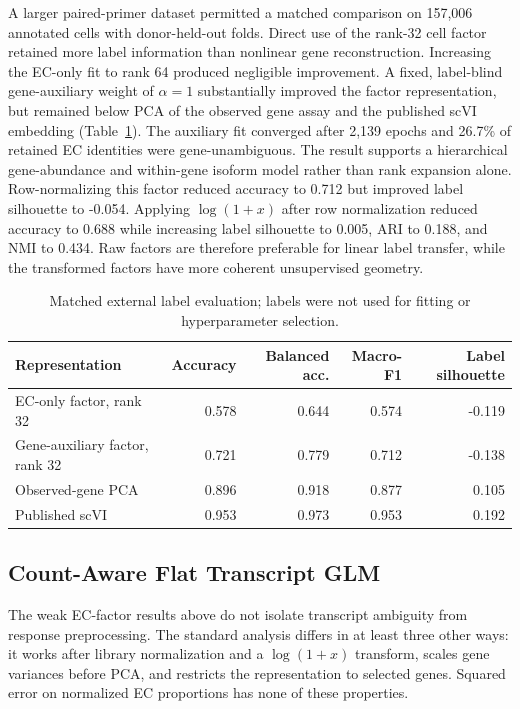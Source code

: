 \documentclass[11pt]{article}
\begin{document}
A larger paired-primer dataset permitted a matched comparison on 157,006
annotated cells with donor-held-out folds. Direct use of the rank-32 cell
factor retained more label information than nonlinear gene reconstruction.
Increasing the EC-only fit to rank 64 produced negligible improvement. A
fixed, label-blind gene-auxiliary weight of \(\alpha=1\) substantially improved
the factor representation, but remained below PCA of the observed gene assay
and the published scVI embedding (Table~\ref{tab:gene-aux-validation}).
The auxiliary fit converged after 2,139 epochs and 26.7\% of retained EC
identities were gene-unambiguous. The result supports a hierarchical
gene-abundance and within-gene isoform model rather than rank expansion alone.
Row-normalizing this factor reduced accuracy to 0.712 but improved label
silhouette to -0.054. Applying \(\log(1+x)\) after row normalization reduced
accuracy to 0.688 while increasing label silhouette to 0.005, ARI to 0.188,
and NMI to 0.434. Raw factors are therefore preferable for linear label
transfer, while the transformed factors have more coherent unsupervised
geometry.

\begin{table}[h]
  \centering
  \footnotesize
  \begin{tabular}{lrrrr}
    \toprule
    Representation & Accuracy & Balanced acc. & Macro-F1 & Label silhouette \\
    \midrule
    EC-only factor, rank 32       & 0.578 & 0.644 & 0.574 & -0.119 \\
    Gene-auxiliary factor, rank 32 & 0.721 & 0.779 & 0.712 & -0.138 \\
    Observed-gene PCA              & 0.896 & 0.918 & 0.877 &  0.105 \\
    Published scVI                 & 0.953 & 0.973 & 0.953 &  0.192 \\
    \bottomrule
  \end{tabular}
  \caption{Matched external label evaluation; labels were not used for fitting
  or hyperparameter selection.}
  \label{tab:gene-aux-validation}
\end{table}

\subsection*{Count-Aware Flat Transcript GLM}

The weak EC-factor results above do not isolate transcript ambiguity from
response preprocessing. The standard analysis differs in at least three other
ways: it works after library normalization and a \(\log(1+x)\) transform,
scales gene variances before PCA, and restricts the representation to selected
genes. Squared error on normalized EC proportions has none of these
properties.
\end{document}
